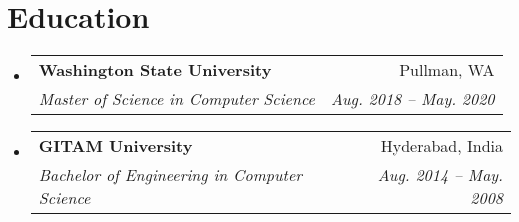\documentclass[letterpaper,11pt]{article}
\makeatletter
\newcommand{\resumeSubheading}[4]{
  \vspace{-1pt}\item
    \begin{tabular*}{0.97\textwidth}[t]{l@{\extracolsep{\fill}}r}
      \textbf{#1} & #2 \\
      \textit{\small#3} & \textit{\small #4} \\
    \end{tabular*}\vspace{-5pt}
}
\newcommand{\resumeSubHeadingListStart}{\begin{itemize}[leftmargin=*]}
\newcommand{\resumeSubHeadingListEnd}{\end{itemize}}
\makeatother
\begin{document}
\section{Education}
  \resumeSubHeadingListStart
    \resumeSubheading
      {Washington State University}{Pullman, WA}
      {Master of Science in Computer Science}{Aug. 2018 -- May. 2020}
    \resumeSubheading
      {GITAM University}{Hyderabad, India}
      {Bachelor of Engineering in Computer Science}{Aug. 2014 -- May. 2008}
  \resumeSubHeadingListEnd

%


\end{document}

